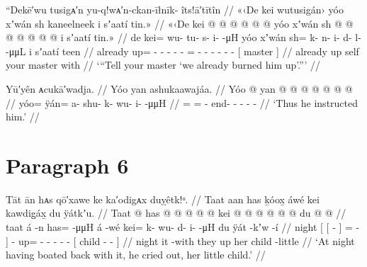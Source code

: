 \ex\label{ex:90-63-tell-master-burned-him-up}%
%
\begingl
	\glpreamble	“Dekē′wu tusigᴀ′n yu-q!wᴀ′n-ckan-īłnīk- îts!ā′tītîn //
	\glpreamble	«\!‹\!De kei wutusigán\!› yóo xʼwán sh kaneelneek i sʼaatí tin.\!» //
	\gla	«\!‹\!De
		kei @  @ {} @ {} @ {} @ {} @ {}
		yóo xʼwán
		sh @  @ {} @ {} @ {} @ {} @ {} @ {}
		{} i sʼaatí tin.\!» {} //
	\glb	\phantom{«\!‹\!}de
		kei= wu- tu- s- i-  -μH
		yóo xʼwán
		sh= k- n- i- d- l-  -μμL
		{} i sʼaatí teen {} //
	\glc	\phantom{«\!‹\!}already
		up= - - - -  -
		 
		= - - - - -  -
		{}[  master  {}] //
	\gld	\phantom{«\!‹\!}already
		up  {} {} {} {} {}
		 
		self  {} {} {} {} {} {}
		{} your master with {} //
	\glft	‘“Tell your master ‘we already burned him up’.”’
		//
\endgl
\xe

\ex\label{ex:90-64-thus-instructed}%
%
\begingl
	\glpreamble	Yū′yên ᴀcukā′wadja. //
	\glpreamble	Yóo yan ashukaawajáa. //
	\gla	Yóo @ yan @  @ {} @ {} @ {} @ {} @ {} @ {} //
	\glb	yóo= ÿán= a- shu- k- wu- i-  -μμH //
	\glc	{}= = - end- - - -  - //
	\glft	‘Thus he instructed him.’
		//
\endgl
\xe

\section{Paragraph 6}\label{sec:90-para-6}

\ex\label{ex:90-65-cried-out}%
%
\begingl
	\glpreamble	Tāt ān hᴀs qō′xawe ke ka′odigᴀx duỵêtk!ᵒ. //
	\glpreamble	Taat aan has ḵóox̱ áwé kei kawdig̱áx̱ du ÿátkʼu. //
	\gla	{} Taat {}
		{} {}  @ {} {}
			has @  @ {} @ {} @ {} {}
		 @ {}
		kei @  @ {} @ {} @ {} @ {} @ {} 
		{} du  @ {} @ {} {} //
	\glb	{} taat {}
		{} {} á -n {}
			has= {}  -μμH {} {}
		á -wé
		kei= k- wu- d- i-  -μH
		{} du ÿát -kʼw -í {} //
	\glc	{} night {}
		{}[ {}[  - {}]
			= \·  - \· {}]
		 -
		up= - - - -  -
		{}[  child - - {}] //
	\gld	{} night {}
		{} {} it -with {}
			they\•  {} {} {} {}
		 {}
		up  {} {} {} {} {}
		{} her child -little {} {} //
	\glft	‘At night having boated back with it, he cried out, her little child.’
		//
\endgl
\xe


